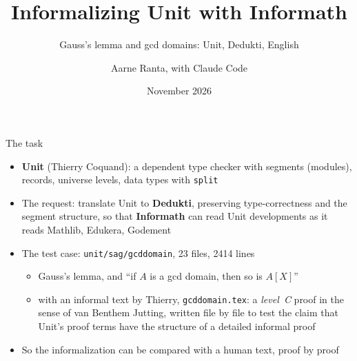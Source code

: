 \documentclass[10pt,aspectratio=169]{beamer}
\title{Informalizing Unit with Informath}
\subtitle{Gauss's lemma and gcd domains: Unit, Dedukti, English}
\author{Aarne Ranta, with Claude Code}
\date{November 2026}
\newcommand{\file}[1]{\texttt{#1}}
\begin{document}
\maketitle

\begin{frame}{The task}

\small
\begin{itemize}
\item \textbf{Unit} (Thierry Coquand): a dependent type checker with segments
  (modules), records, universe levels, data types with \texttt{split}
\item The request: translate Unit to \textbf{Dedukti}, preserving
  type-correctness and the segment structure, so that \textbf{Informath} can
  read Unit developments as it reads Mathlib, Edukera, Godement
\item The test case: \file{unit/sag/gcddomain}, 23 files, 2414 lines
  \begin{itemize}
  \item Gauss's lemma, and ``if $A$ is a gcd domain, then so is $A[X]$''
  \item with an informal text by Thierry, \file{gcddomain.tex}: a
    \emph{level~C} proof in the sense of van Benthem Jutting, written
    file by file to test the claim that Unit's proof terms have the
    structure of a detailed informal proof
  \end{itemize}
\item So the informalization can be compared with a human text, proof by
  proof
\end{itemize}

\end{frame}
\end{document}
